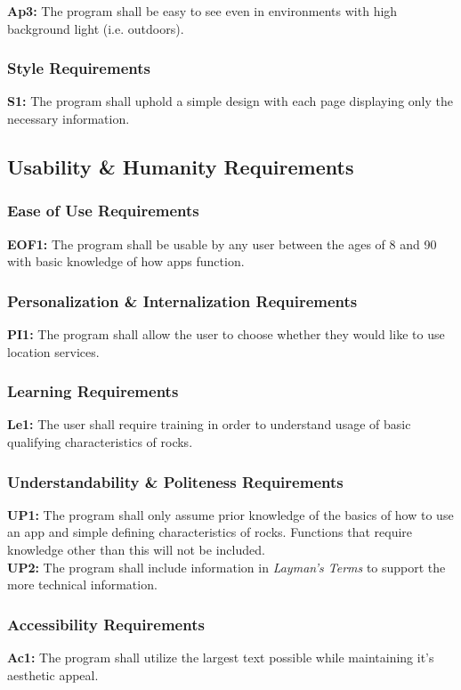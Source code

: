 \documentclass[titlepage]{article}
\begin{document}
\noindent\textbf{Ap3:} The program shall be easy to see even in environments with high background light (i.e. outdoors).

\subsubsection{Style Requirements}
\textbf{S1:} The program shall uphold a simple design with each page displaying only the necessary information.

\subsection{Usability \& Humanity Requirements}
\subsubsection{Ease of Use Requirements}
\textbf{EOF1:} The program shall be usable by any user between the ages of 8 and 90 with basic knowledge of how apps function.
\subsubsection{Personalization \& Internalization Requirements}
\textbf{PI1:} The program shall allow the user to choose whether they would like to use location services.
\subsubsection{Learning Requirements}
\textbf{Le1:} The user shall require training in order to understand usage of basic qualifying characteristics of rocks.
\subsubsection{Understandability \& Politeness Requirements}
\textbf{UP1:} The program shall only assume prior knowledge of the basics of how to use an app and simple defining characteristics of rocks. Functions that require knowledge other than this will not be included.\\

\noindent\textbf{UP2:} The program shall include information in \textit{Layman's Terms} to support the more technical information.
\subsubsection{Accessibility Requirements}
\textbf{Ac1:} The program shall utilize the largest text possible while maintaining it's aesthetic appeal.\\
\end{document}
